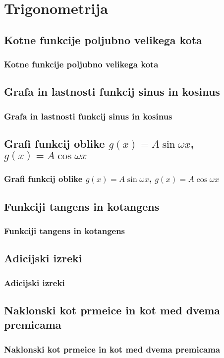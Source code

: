 \section{Trigonometrija}

\begin{frame}
    \sectionpage
\end{frame}

\begin{frame}
\end{frame}

    \subsection{Kotne funkcije poljubno velikega kota}

        \begin{frame}
            \frametitle{Kotne funkcije poljubno velikega kota}
        \end{frame}

    \subsection{Grafa in lastnosti funkcij sinus in kosinus}

        \begin{frame}
            \frametitle{Grafa in lastnosti funkcij sinus in kosinus}
        \end{frame}

    \subsection{Grafi funkcij oblike $g(x)=A\sin{\omega x}$, $g(x)=A\cos{\omega x}$}

        \begin{frame}
            \frametitle{Grafi funkcij oblike $g(x)=A\sin{\omega x}$, $g(x)=A\cos{\omega x}$}
        \end{frame}

    \subsection{Funkciji tangens in kotangens}

        \begin{frame}
            \frametitle{Funkciji tangens in kotangens}
        \end{frame}

    \subsection{Adicijski izreki}

        \begin{frame}
            \frametitle{Adicijski izreki}
        \end{frame}

    \subsection{Naklonski kot prmeice in kot med dvema premicama}

        \begin{frame}
            \frametitle{Naklonski kot prmeice in kot med dvema premicama}
        \end{frame}

